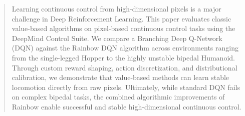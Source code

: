 \documentclass{article}
\begin{document}
\setlength{\textfloatsep}{0.15in}

\printAffiliationsAndNotice{}

\begin{abstract}
Learning continuous control from high-dimensional pixels is a major challenge in Deep Reinforcement Learning. This paper evaluates classic value-based algorithms on pixel-based continuous control tasks using the DeepMind Control Suite. We compare a Branching Deep Q-Network (DQN) against the Rainbow DQN algorithm across environments ranging from the single-legged Hopper to the highly unstable bipedal Humanoid. Through custom reward shaping, action discretization, and distributional calibration, we demonstrate that value-based methods can learn stable locomotion directly from raw pixels. Ultimately, while standard DQN fails on complex bipedal tasks, the combined algorithmic improvements of Rainbow enable successful and stable high-dimensional continuous control.
\end{abstract}









\end{document}
